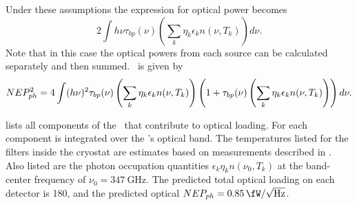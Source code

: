 Under these assumptions the expression for optical power becomes
\begin{equation} \label{eqn:ch4-opt-pow-all}
  2 \int h \nu \tau_{bp}(\nu) \left( \sum_k \eta_k \epsilon_k n(\nu,T_k) \right) d \nu.
\end{equation}
Note that in this case the optical powers from each source can be calculated separately and then summed.
\NEPph\ is given by
\begin{equation} \label{eqn:ch4-nep-all}
  NEP_{ph}^2 = 4 \int (h \nu)^2 \tau_{bp}(\nu) \left( \sum_k \eta_k \epsilon_k n(\nu,T_k) \right) 
       \left( 1 + \tau_{bp}(\nu) \left( \sum_k \eta_k \epsilon_k n(\nu,T_k) \right)  \right) d \nu.
\end{equation}

 lists all components of the \Imager\ that contribute to optical loading.
For each component  is integrated over the \Imager's optical band.
The temperatures listed for the filters inside the cryostat are estimates based on measurements described in .
Also listed are the photon occupation quantities $\epsilon_k \eta_k n(\nu_0,T_k)$ at the band-center frequency of $\nu_0 = \SI{347}{\GHz}$.
The predicted total optical loading on each detector is \SI{180}{\pW}, and the predicted optical $NEP_{ph} = \Pnoisef{0.85}$.

